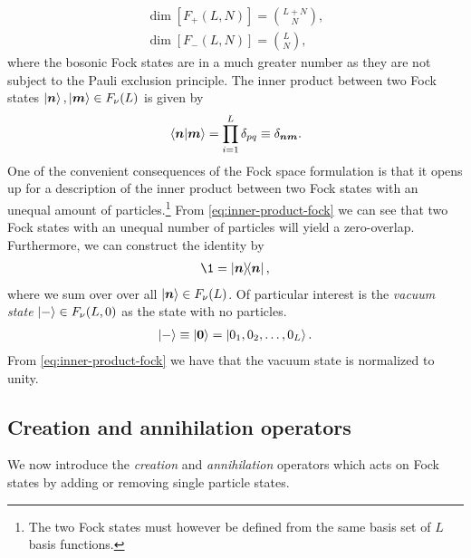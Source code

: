             \begin{gather}
                \dim[F_{+}(L, N)] = \binom{L + N}{N},
                \\
                \dim[F_{-}(L, N)] = \binom{L}{N},
            \end{gather}
            where the bosonic Fock states are in a much greater number as they
            are not subject to the Pauli exclusion principle.
            The inner product between two Fock states $\ket{\boldsymbol{n}},
            \ket{\boldsymbol{m}} \in F_{\nu}(L)$ is given by
            \begin{align}
                \braket{\boldsymbol{n}}{\boldsymbol{m}} = \prod_{i = 1}^{L} \delta_{pq}
                \equiv \delta_{\boldsymbol{n}\boldsymbol{m}}.
                \label{eq:inner-product-fock}
            \end{align}
            One of the convenient consequences of the Fock space formulation is
            that it opens up for a description of the inner product between two
            Fock states with an unequal amount of particles.\footnote{%
                The two Fock states must however be defined from the same basis
                set of $L$ basis functions.
            }
            From \autoref{eq:inner-product-fock} we can see that two Fock states
            with an unequal number of particles will yield a zero-overlap.
            Furthermore, we can construct the identity by
            \begin{align}
                \1 = \dyad{\vfg{n}}{\vfg{n}},
                \label{eq:fock-identity}
            \end{align}
            where we sum over over all $\ket{\boldsymbol{n}} \in F_{\nu}(L)$.
            Of particular interest is the \emph{vacuum state} $\ket{-} \in
            F_{\nu}(L, 0)$ as the state with no particles.
            \begin{align}
                \ket{-} \equiv \ket{\boldsymbol{0}}
                = \ket{0_1, 0_2, \dots, 0_L}.
            \end{align}
            From \autoref{eq:inner-product-fock} we have that the vacuum state
            is normalized to unity.

        \subsection{Creation and annihilation operators}
            We now introduce the \emph{creation} and \emph{annihilation}
            operators which acts on Fock states by adding or removing single
            particle states.

